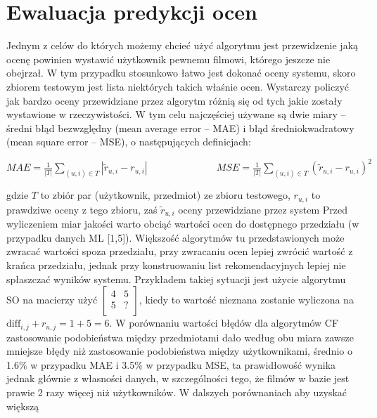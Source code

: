 \documentclass{pracamgr}
\begin{document}
  \section{Ewaluacja predykcji ocen}
   Jednym z celów do których możemy chcieć użyć algorytmu jest przewidzenie jaką ocenę powinien wystawić użytkownik pewnemu filmowi, którego jeszcze nie obejrzał.
   W tym przypadku stosunkowo łatwo jest dokonać oceny systemu, skoro zbiorem testowym jest lista niektórych takich właśnie ocen.
   Wystarczy policzyć jak bardzo oceny przewidziane przez algorytm różnią się od tych jakie zostały wystawione w rzeczywistości.
   W tym celu najczęściej używane są dwie miary -- średni błąd bezwzględny (mean average error -- MAE) i błąd średniokwadratowy (mean square error -- MSE),
   o następujących definicjach:\newline
   \begin{center}
    $
    MAE=\frac{1}{|T|}\sum\limits_{(u,i)\in T}|\tilde{r}_{u,i}-r_{u,i}|\quad\quad\quad\quad\quad\quad\quad
    MSE=\frac{1}{|T|}\sum\limits_{(u,i)\in T}(\tilde{r}_{u,i}-r_{u,i})^2
    $
   \end{center}
   {\scriptsize
    gdzie $T$ to zbiór par (użytkownik, przedmiot) ze zbioru testowego, $r_{u,i}$ to prawdziwe oceny z tego zbioru,\newline
    zaś $\tilde{r}_{u,i}$ oceny przewidziane przez system
   }\newline
   Przed wyliczeniem miar jakości warto obciąć wartości ocen do dostępnego przedziału (w przypadku danych ML [1,5]).
   Większość algorytmów tu przedstawionych może zwracać wartości spoza przedziału, przy zwracaniu ocen lepiej zwrócić wartość z krańca przedziału,
   jednak przy konstruowaniu list rekomendacyjnych lepiej nie spłaszczać wyników systemu.\newline
   Przykładem takiej sytuacji jest użycie algorytmu SO na macierzy użyć
   $\left[\begin{array}{cc}
    4&5\\
    5&?\\
   \end{array}\right]$, kiedy to wartość nieznana zostanie wyliczona na $\text{diff}_{i,j}+r_{u,j}=1+5=6$.\newline
   W porównaniu wartości błędów dla algorytmów CF zastosowanie podobieństwa między przedmiotami dało według obu miara zawsze mniejsze błędy
   niż zastosowanie podobieństwa między użytkownikami, średnio o 1.6\% w przypadku MAE i 3.5\% w przypadku MSE, ta prawidłowość wynika jednak głównie
   z własności danych, w szczególności tego, że filmów w bazie jest prawie 2 razy więcej niż użytkowników. W dalszych porównaniach aby uzyskać większą
\end{document}
